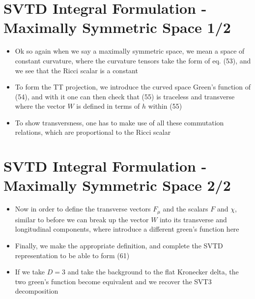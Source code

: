 \documentclass[10pt,letterpaper]{article}
\numberwithin{equation}{section}
\begin{document}

\section{SVTD Integral Formulation - Maximally Symmetric Space 1/2}
\begin{itemize}
	\item Ok so again when we say a maximally symmetric space, we mean a space of constant curvature, where the curvature tensors take the form of eq. (53), and we see that the Ricci scalar is a constant
	\item To form the TT projection, we introduce the curved space Green's function of (54), and with it one can then check that (55) is traceless and transverse where the vector $W$ is defined in terms of $h$ within (55)
	\item To show transversness, one has to make use of all these commutation relations, which are proportional to the Ricci scalar
\end{itemize}


\section{SVTD Integral Formulation - Maximally Symmetric Space 2/2}
\begin{itemize}
	\item Now in order to define the transverse vectors $F_{\mu}$ and the scalars $F$ and $\chi$, similar to before we can break up the vector $W$ into its transverse and longitudinal components, where introduce a different green's function here
	\item Finally, we make the appropriate definition, and complete the SVTD representation to be able to form (61)
	\item If we take $D=3$ and take the background to the flat Kronecker delta, the two green's function become equivalent and we recover the SVT3 decomposition
\end{itemize}

\end{document}
